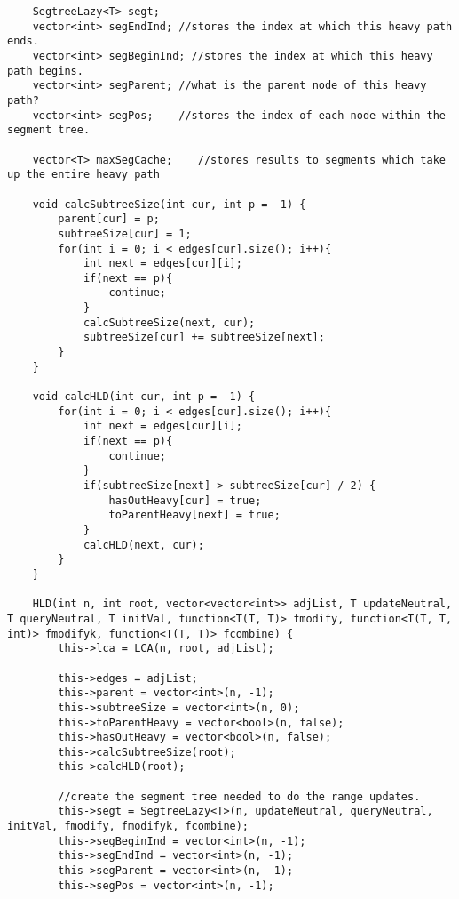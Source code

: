 \documentclass[8pt, headheight=10pt]{scrartcl}
\begin{document}
\begin{multicols*}{3}
\begin{lstlisting}
    SegtreeLazy<T> segt;
    vector<int> segEndInd; //stores the index at which this heavy path ends. 
    vector<int> segBeginInd; //stores the index at which this heavy path begins.
    vector<int> segParent; //what is the parent node of this heavy path?
    vector<int> segPos;    //stores the index of each node within the segment tree. 

    vector<T> maxSegCache;    //stores results to segments which take up the entire heavy path

    void calcSubtreeSize(int cur, int p = -1) {
        parent[cur] = p;
        subtreeSize[cur] = 1;
        for(int i = 0; i < edges[cur].size(); i++){
            int next = edges[cur][i];
            if(next == p){
                continue;
            }
            calcSubtreeSize(next, cur);
            subtreeSize[cur] += subtreeSize[next];
        }
    }

    void calcHLD(int cur, int p = -1) {
        for(int i = 0; i < edges[cur].size(); i++){
            int next = edges[cur][i];
            if(next == p){
                continue;
            }
            if(subtreeSize[next] > subtreeSize[cur] / 2) {
                hasOutHeavy[cur] = true;
                toParentHeavy[next] = true;
            }
            calcHLD(next, cur);
        }
    }

    HLD(int n, int root, vector<vector<int>> adjList, T updateNeutral, T queryNeutral, T initVal, function<T(T, T)> fmodify, function<T(T, T, int)> fmodifyk, function<T(T, T)> fcombine) {
        this->lca = LCA(n, root, adjList);
        
        this->edges = adjList;
        this->parent = vector<int>(n, -1);
        this->subtreeSize = vector<int>(n, 0);
        this->toParentHeavy = vector<bool>(n, false);
        this->hasOutHeavy = vector<bool>(n, false);
        this->calcSubtreeSize(root);
        this->calcHLD(root);

        //create the segment tree needed to do the range updates. 
        this->segt = SegtreeLazy<T>(n, updateNeutral, queryNeutral, initVal, fmodify, fmodifyk, fcombine);
        this->segBeginInd = vector<int>(n, -1);
        this->segEndInd = vector<int>(n, -1);
        this->segParent = vector<int>(n, -1);
        this->segPos = vector<int>(n, -1);


\end{lstlisting}
\end{multicols*}
\end{document}
